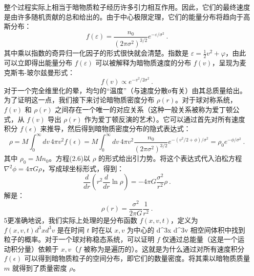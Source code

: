 整个过程实际上相当于暗物质粒子经历许多引力相互作用。因此，它们的最终速度是由许多随机贡献的总和给出的。由于中心极限定理，它们的能量分布将趋向于高斯分布：
\begin{equation}
 f(\varepsilon) =   \frac{n_0}{(2\pi\sigma^2)^{3/2}}  e^{-\varepsilon/\sigma^2} ~. 
\end{equation}
其中乘以指数的奇异归一化因子的形式很快就会清楚。指数是 \(\varepsilon = \frac{1}{2}v^2 + \varphi\)，由此可以立即得出能量分布 \(f(\varepsilon)\) 可以被解释为暗物质速度的分布 \(f(v)\)，呈现为麦克斯韦-玻尔兹曼形式：
\begin{equation}
 f(v) \propto e^{-v^2/2\sigma^2}~. 
\end{equation}
对于一个完全维里化的晕，均匀的“温度”（与速度分散σ有关）由其总质量给出。为了证明这一点，我们接下来讨论暗物质密度分布 \(\rho(r)\)。对于球对称系统，\(f(v)\) 和 \(\rho(r)\) 之间存在一个唯一的对应关系（这种一般关系被称为爱丁顿公式，从 \(f(v)\) 导出 \(\rho(r)\) 作为爱丁顿反演的艺术）。它可以通过首先对所有速度积分 \(f(\epsilon)\) 来推导，然后得到暗物质密度分布的隐式表达式：
\begin{equation}
 \rho = M \int_0^\infty dv \, 4\pi v^2 f(\epsilon) = M \int_0^\infty dv \, 4\pi v^2 \frac{n_0}{(2\pi\sigma^2)^{3/2}} e^{-(v^2/2+\phi)/\sigma^2} = \rho_0 e^{-\phi/\sigma^2}~. 
\end{equation}
其中 \(\rho_0 = Mn_0\)。方程(2.6)以 \(\rho\) 的形式给出引力势。将这个表达式代入泊松方程 \(\nabla^2\phi = 4\pi G\rho\)，写成球坐标形式，得到：
\begin{equation}
 \frac{d}{dr} \left( r^2 \frac{d}{dr} \ln\rho \right) = -4\pi G \frac{\sigma^2}{r^2} \rho~. 
\end{equation}
解是：
\begin{equation}
\rho(r) = \frac{\sigma^2}{2\pi G} \frac{1}{r^2}~. 
\end{equation}
5更准确地说，我们实际上处理的是分布函数 \(f(x, v, t)\)，定义为 \(f(x, v, t) d^3x d^3v\) 是在时间 \(t\) 时在以 \(x, v\) 为中心的 d^3x d^3v 相空间体积中找到粒子的概率。对于一个球对称稳态系统，可以证明 \(f\) 仅通过总能量（这是一个运动积分量）依赖于 \(x, v\)（\(f\) 被称为是遍历的）。这就是为什么通过对所有速度积分 \(f(\epsilon)\) 可以得到暗物质粒子的空间分布，即它们的数量密度。将其乘以暗物质质量 \(m\) 就得到了质量密度 \(\rho\)。
 



